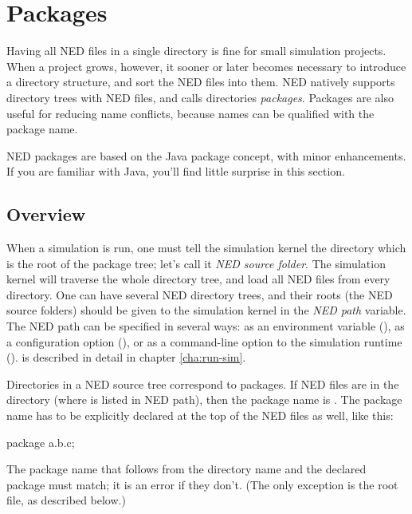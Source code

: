 \section{Packages}
\label{sec:ned-lang:packages}

Having all NED files in a single directory is fine for small simulation projects.
When a project grows, however, it sooner or later becomes
necessary to introduce a directory structure, and sort the NED files into
them. NED natively supports directory trees with NED files, and calls
directories \textit{packages}. Packages are also useful for reducing
name conflicts, because names can be qualified with the package name.

\begin{note}
    NED packages are based on the Java package concept, with minor
    enhancements. If you are familiar with Java, you'll find little
    surprise in this section.
\end{note}

\subsection{Overview}
\label{sec:ned-lang:packages-overview}

When a simulation is run, one must tell the simulation kernel the
directory which is the root of the package tree; let's call it
\textit{NED source folder}. The simulation kernel will traverse
the whole directory tree, and load all NED files from every directory.
One can have several NED directory trees, and their roots (the NED source
folders) should be given to the simulation kernel in the \textit{NED path}
variable. The NED path can be specified in several ways: as an environment
variable (), as a configuration option (),
or as a command-line option to the simulation runtime ().  is
described in detail in chapter \ref{cha:run-sim}.

Directories in a NED source tree correspond to packages. If NED files are
in the  directory (where  is listed in NED
path), then the package name is . The package name has to be
explicitly declared at the top of the NED files as well, like this:

\begin{ned}
package a.b.c;
\end{ned}

The package name that follows from the directory name and the declared
package must match; it is an error if they don't. (The only exception
is the root  file, as described below.)

